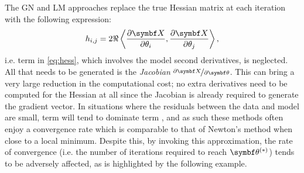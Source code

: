 The \ac{GN} and \ac{LM} approaches replace the true Hessian matrix at each
iteration with the following expression:
\begin{equation}
    h_{i,j} = 2 \Re
        \left\langle
            \frac{\partial \bX}{\partial \theta_i},
            \frac{\partial \bX}{\partial \theta_j}
        \right\rangle,
    \label{eq:hess-approx}
\end{equation}
i.e. term  in \cref{eq:hess}, which involves the model second
derivatives, is neglected. All that needs to be generated is the \emph{Jacobian}
$\nicefrac{\partial \bX}{\partial \bth}$. This can
bring a very large reduction in the computational cost; no extra
derivatives need to be computed for the Hessian at all since the Jacobian is
already required to generate the gradient vector.
In situations where the residuals between the data and model are small, term
 will tend to dominate term , and as such these methods
often enjoy a convergence rate which is comparable to that of Newton's method
when close to a local minimum. Despite this, by invoking this approximation, the
rate of convergence (i.e. the number of iterations required to reach
$\bthstar$) tends to be adversely affected, as is highlighted by the following
example.

